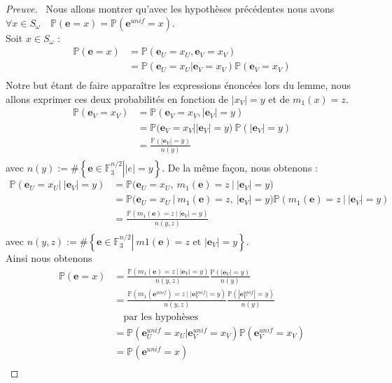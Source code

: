 \documentclass[12pt]{article}
\theoremstyle{plain}
\newcommand{\F}{\mathbb{F}}
\newcommand{\e}{\mathbf{e}}
\begin{document}
\begin{proof}[Preuve]\
Nous allons montrer qu'avec les hypothèses précédentes nous avons $\forall x \in S_{\omega} \quad \mathbb{P}(\e = x) = \mathbb{P}(\e^{unif} = x)$.\\
Soit $x \in S_{\omega}$ :
\begin{equation*}
\begin{split}
\mathbb{P}(\e = x) &= \mathbb{P}(\e_U = x_U, \e_V = x_V)\\
&= \mathbb{P}(\e_U = x_U | \e_V = x_V)\mathbb{P}(\e_V = x_V)\\
\end{split}
\end{equation*}
Notre but étant de faire apparaître les expressions énoncées lors du lemme, nous allons exprimer ces deux probabilités en fonction de $|x_V| = y$ et de $m_1(x) = z$.
\begin{equation*}
\begin{split}
\mathbb{P}(\e_V = x_V) &= \mathbb{P}(\e_V = x_V, |\e_V| = y)\\
&= \left.\mathbb{P}(\e_V = x_V \right| |\e_V| = y)\ \mathbb{P}(|\e_V| = y)\\
&= \frac{\mathbb{P}(|\e_V| = y)}{n(y)}\\
\end{split}
\end{equation*}
avec $n(y) := \#\left\{ \left.\e \in \F_3^{n/2} \right| |e| = y\right\}$.
De la même façon, nous obtenons :
\begin{equation*}
\begin{split}
\mathbb{P}(\e_U = x_U |\ |\e_V| = y) &= \left.\mathbb{P}(\e_U = x_U ,\ m_1(\e) = z\ \right|\ |\e_V| = y)\\
&= \left.\mathbb{P}(\e_U = x_U\ \right|\ m_1(\e) = z,\ |\e_V| = y)\mathbb{P}(m_1(\e) = z\ |\ |\e_V| = y)\\
&= \frac{\mathbb{P}(m_1(\e) = z\ |\ |\e_V| = y)}{n(y,z)}\\
\end{split}
\end{equation*}
avec $n(y,z) := \#\left\{ \left.\e \in \F_3^{n/2} \right|\  m1(\e) = z\text{ et } |\e_V| = y \right\}$.\\
Ainsi nous obtenons
\begin{equation*}
\begin{split}
\mathbb{P}(\e = x) &= \frac{\mathbb{P}(m_1(\e) = z\ |\ |\e_V| = y)}{n(y,z)}\frac{\mathbb{P}(|\e_V| = y)}{n(y)}\\
 &= \frac{\mathbb{P}(m_1(\e^{unif}) = z\ |\ |\e_V^{unif}| = y)}{n(y,z)}\frac{\mathbb{P}(|\e_V^{unif}| = y)}{n(y)}\\
 &\quad \text{par les hypohèses}\\
 &= \mathbb{P}(\e_U^{unif} = x_U | \e_V^{unif} = x_V)\mathbb{P}(\e_V^{unif} = x_V)\\
 &= \mathbb{P}(\e^{unif} = x)\\
\end{split}
\end{equation*}
\end{proof}
\end{document}
